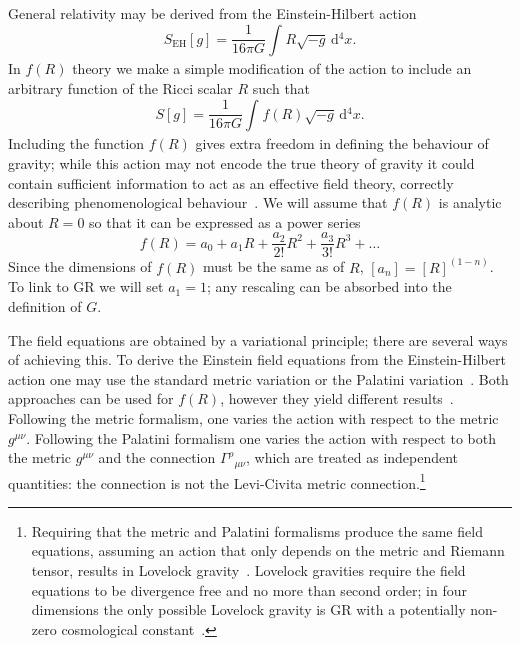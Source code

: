 \documentclass[aps,prd,amsfonts,amssymb,amsmath,nofootinbib,reprint,showpacs]{revtex4-1}
\newcommand{\sub}[1]{\ensuremath{_\text{#1}}}
\newcommand{\dd}{\ensuremath{\text{d}}}
\newcommand{\intd}[4]{\ensuremath{\int_{#1}^{#2}{#3}\,\dd{#4}}}
\newcommand{\recip}[1]{\ensuremath{\frac{1}{#1}}}
\begin{document}
General relativity may be derived from the Einstein-Hilbert action~\cite{Misner1973, Landau1975}
\begin{equation}
S\sub{EH}[g] = \recip{16\pi G}\intd{}{}{R\sqrt{-g}}{^4x}.
\end{equation}
In $f(R)$ theory we make a simple modification of the action to include an arbitrary function of the Ricci scalar $R$ such that~\cite{Buchdahl1970}
\begin{equation}
S[g] = \recip{16\pi G}\intd{}{}{f(R)\sqrt{-g}}{^4x}.
\end{equation}
Including the function $f(R)$ gives extra freedom in defining the behaviour of gravity; while this action may not encode the true theory of gravity it could contain sufficient information to act as an effective field theory, correctly describing phenomenological behaviour~\cite{Park2010}. We will assume that $f(R)$ is analytic about $R = 0$ so that it can be expressed as a power series~\cite{Buchdahl1970, Capozziello2007, Clifton2008, Psaltis2008}
\begin{equation}
f(R) = a_0 + a_1 R + \frac{a_2}{2!}R^2 + \frac{a_3}{3!}R^3 + \ldots
\end{equation}
Since the dimensions of $f(R)$ must be the same as of $R$, $[a_n] = [R]^{(1-n)}$. To link to GR we will set $a_1 = 1$; any rescaling can be absorbed into the definition of $G$.

The field equations are obtained by a variational principle; there are several ways of achieving this. To derive the Einstein field equations from the Einstein-Hilbert action one may use the standard metric variation or the Palatini variation~\cite{Misner1973}. Both approaches can be used for $f(R)$, however they yield different results~\cite{Sotiriou2010, DeFelice2010}. Following the metric formalism, one varies the action with respect to the metric $g^{\mu\nu}$. Following the Palatini formalism one varies the action with respect to both the metric $g^{\mu\nu}$ and the connection ${\Gamma^\rho}_{\mu\nu}$, which are treated as independent quantities: the connection is not the Levi-Civita metric connection.\footnote{Requiring that the metric and Palatini formalisms produce the same field equations, assuming an action that only depends on the metric and Riemann tensor, results in Lovelock gravity~\cite{Exirifard2008}. Lovelock gravities require the field equations to be divergence free and no more than second order; in four dimensions the only possible Lovelock gravity is GR with a potentially non-zero cosmological constant~\cite{Lovelock1970, Lovelock1971, Lovelock1972}.}
\end{document}
